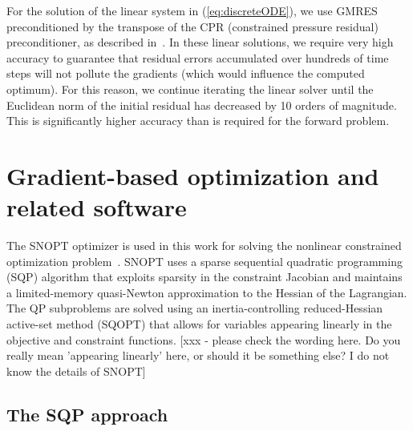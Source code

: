 \documentclass[twocolumn,numbook]{svjour3}          %
\def\u{{\vec u}}
\def\c{{\vec c}}
\def\x{{\vec x}}
\def\s{{\vec s}}
\def\g{{\vec{G}}}
\def\blambda{{\pmb{\lambda}}}%
\def\nthinsp{\mskip -2   mu}
\def\blambdahat{\skew1\widehat \blambda}
\def\blambdastar{\blambda\superstar}
\def\shat{\widehat \s}
\def\sstar{\s\superstar}
\def\superstar{^{\raise 0.5pt\hbox{$\nthinsp *$}}}
\def\xstar{\x\superstar}
\def\uhat{\skew{2.8}\widehat \u}
\def\ustar{\u\superstar}
\def\GQPk{GQP$_k$}
\def\SNOPT {{\small SNOPT}}
\def\SQOPT {{\small SQOPT}}
\begin{document}
For the solution of the linear system in (\ref{eq:discreteODE}), we use
GMRES preconditioned by the transpose of the CPR (constrained
pressure residual) preconditioner, as described in~\cite{CPRA}. In these
linear solutions, we require very high accuracy to guarantee that residual
errors accumulated over hundreds of time steps will not pollute the gradients
(which would influence the computed optimum). For this reason, we continue
iterating the linear solver until the Euclidean norm of the initial residual has
decreased by 10 orders of magnitude. This is significantly higher accuracy than
is required for the forward problem.




\section{Gradient-based optimization and related software}
\label{sec:SQPSNOPT}

The \SNOPT{} optimizer is used in this work for solving the nonlinear constrained
optimization problem~\cite{SNOPT}. \SNOPT{} uses a sparse sequential quadratic
programming (SQP) algorithm that exploits sparsity in
the constraint Jacobian and maintains a limited-memory quasi-Newton
approximation to the Hessian of the Lagrangian. The QP
subproblems are solved using an inertia-controlling reduced-Hessian
active-set method (\SQOPT) that allows for variables appearing
linearly in the objective and constraint functions. [xxx - please check the wording here. Do you really mean 'appearing linearly' here, or should it be something else? I do not know the details of SNOPT]
 
\subsection{The SQP approach}

%
\end{document}
